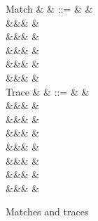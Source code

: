 \begin{figure}
\begin{syntaxfig}
\mbox{Match}
&
\xi
&
::=
&
&
\\
&&&
&
\\
&&&
&
\\
&&&
&
\\
&&&
&
\\
&&&
&
\\[2mm]
\mbox{Trace}
&
&
::=
&
&
\\
&&&
&
\\
&&&
&
\\
&&&
\trNil
&
\\
&&&
&
\\
&&&
&
\\
&&&
&
\\
&&&
&
\end{syntaxfig}
\caption{Matches and traces}
\end{figure}
